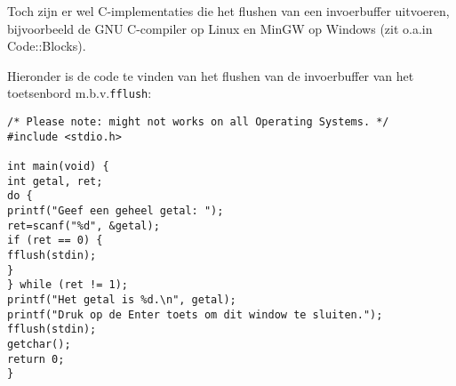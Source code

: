 Toch zijn er wel C-implementaties die het flushen van een invoerbuffer uitvoeren, bijvoorbeeld de GNU C-compiler op Linux en MinGW op Windows (zit o.a.\@ in Code::Blocks).

Hieronder is de code te vinden van het flushen van de invoerbuffer van het toetsenbord m.b.v.\@ \lstinline|fflush|:

\newpage
\begin{lstlisting}
/* Please note: might not works on all Operating Systems. */
#include <stdio.h>

int main(void) {
int getal, ret;
do {
printf("Geef een geheel getal: ");
ret=scanf("%d", &getal);
if (ret == 0) {
fflush(stdin);
}
} while (ret != 1);
printf("Het getal is %d.\n", getal);
printf("Druk op de Enter toets om dit window te sluiten.");
fflush(stdin);
getchar();
return 0;
}
\end{lstlisting}

